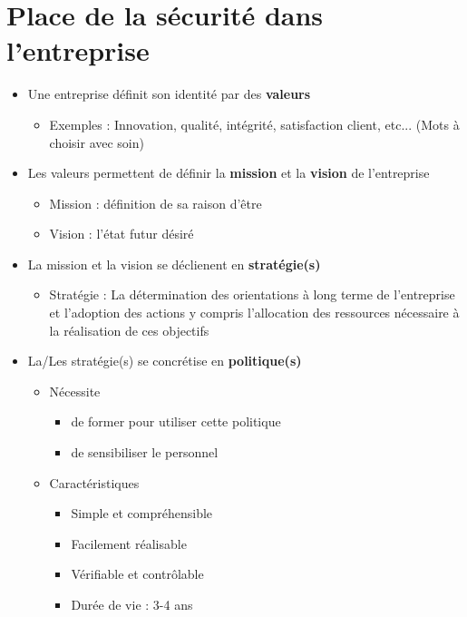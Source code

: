\documentclass[a4paper]{article}
\begin{document}
\section{Place de la sécurité dans l'entreprise}
\begin{itemize}[label=\textbullet, font=\Large]
  \item Une entreprise définit son identité par des \textbf{valeurs}
  \begin{itemize}[label=, font=\scriptsize]
    \item Exemples : Innovation, qualité, intégrité, satisfaction client, etc... (Mots à choisir avec soin)
  \end{itemize}
  \item Les valeurs permettent de définir la \textbf{mission} et la \textbf{vision} de l'entreprise
  \begin{itemize}[label=, font=\scriptsize]
    \item Mission : définition de sa raison d'être
    \item Vision : l'état futur désiré
  \end{itemize}
  \item La mission et la vision se déclienent en \textbf{stratégie(s)}
  \begin{itemize}[label=, font=\scriptsize]
    \item Stratégie : La détermination des orientations à long terme de l'entreprise et l'adoption des actions y compris 
    l'allocation des ressources nécessaire à la réalisation de ces objectifs
  \end{itemize}
  \item La/Les stratégie(s) se concrétise en \textbf{politique(s)}
  \begin{itemize}[label=, font=\scriptsize]
    \item Nécessite
    \begin{itemize}
      \item de former pour utiliser cette politique
      \item de sensibiliser le personnel
    \end{itemize}
    \item Caractéristiques
    \begin{itemize}
      \item Simple et compréhensible
      \item Facilement réalisable
      \item Vérifiable et contrôlable
      \item Durée de vie : 3-4 ans

\end{itemize}
\end{itemize}
\end{itemize}
\end{document}
